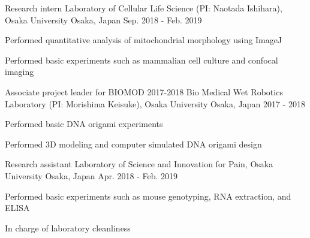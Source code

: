 

\begin{cventries}

  \cventry
  {Research intern} %
  {Laboratory of Cellular Life Science (PI: Naotada Ishihara), Osaka University} %
  {Osaka, Japan} %
  {Sep. 2018 - Feb. 2019} %
  {
    \begin{cvitems} %
      \item {Performed quantitative analysis of mitochondrial morphology using ImageJ}
      \item {Performed basic experiments such as mammalian cell culture and confocal imaging}
    \end{cvitems}
  }

  \cventry
  {Associate project leader for BIOMOD 2017-2018} %
  {Bio Medical Wet Robotics Laboratory (PI: Morishima Keisuke), Osaka University} %
  {Osaka, Japan} %
  {2017 - 2018} %
  {
    \begin{cvitems} %
      \item {Performed basic DNA origami experiments}
      \item {Performed 3D modeling and computer simulated DNA origami design}
    \end{cvitems}
  }


  \cventry
  {Research assistant} %
  {Laboratory of Science and Innovation for Pain, Osaka University} %
  {Osaka, Japan} %
  {Apr. 2018 - Feb. 2019} %
  {
    \begin{cvitems} %
      \item {Performed basic experiments such as mouse genotyping, RNA extraction, and ELISA}
      \item {In charge of laboratory cleanliness}
    \end{cvitems}
  }
 


\end{cventries}
